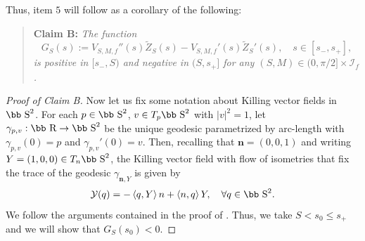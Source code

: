 \documentclass[11pt]{article}
\def\r{\hbox{\bb R}}
\def\s{\hbox{\bb S}}
\newcommand{\abs}[1]{\left\vert #1 \right\vert}
\newcommand{\pscalar}[2]{\left\langle #1, #2 \right\rangle}
\numberwithin{equation} {section}
\begin{document}
Thus, item $5$ will follow as a corollary of the following:
\begin{quote}
	{\bf Claim B:} \it The function
	$$G_S (s) := V_{S,M,f}''(s)\tilde{Z}_S (s)-V_{S,M,f}'(s)\tilde{Z}_S '(s), \quad s \in [s_-,s_+],$$is positive in $[s_-,S)$ and negative in $(S,s_+]$ for any $(S,M) \in (0, \pi / 2] \times \mathcal I _f$.
\end{quote}
\begin{proof}[Proof of Claim B]

Now let us fix some notation about Killing vector fields in $\s^2$. For each $p \in \s^2$, $v \in T_p \s^2$ with $\abs{v}^2 =1$, let $\gamma_{p,v}: \r \to \s^2$ be the unique geodesic parametrized by arc-length with $\gamma_{p,v} (0)=p$ and $\gamma_{p,v}' (0)=v$. Then, recalling that $\textbf{n}=(0,0,1)$ and writing $Y=(1,0 , 0) \in T_{\textbf{n}} \s^2$, the Killing vector field with flow of isometries that fix the trace of the geodesic $\gamma_{\textbf{n},Y}$ is given by
\begin{equation}\label{killingField}
	\mathcal{Y} (q)= -\pscalar{q}{Y} \textbf{n}+ \pscalar{\textbf{n}}{q} Y, \quad \forall q \in \s^2.
\end{equation}
We follow the arguments contained in the proof of \cite[Lemma 3.10]{EM}. Thus, we take $S<s_0 \leq s_+$ and we will show that $G_S (s_0)<0$.


\end{proof}
\end{document}
